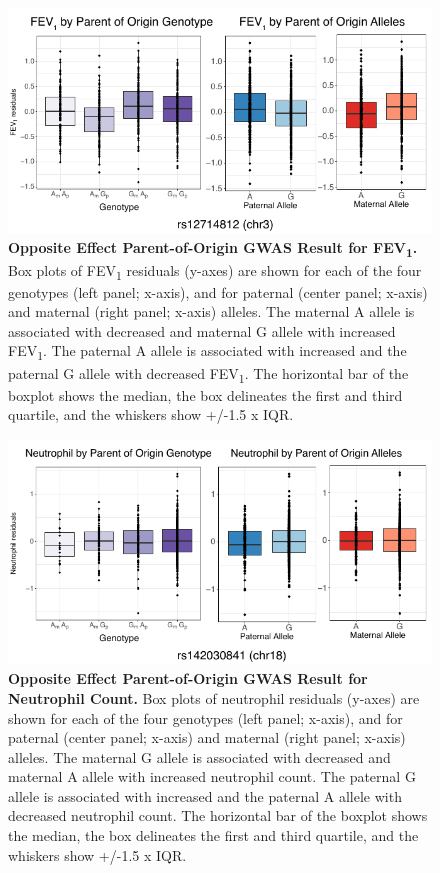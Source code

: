 \begin{figure}[!htb]
\centering
\includegraphics[width=5in]{img/ch02/fig-s13.pdf}
\caption[Opposite Effect Parent-of-Origin GWAS Result for FEV\textsubscript{1}.]{\textbf{Opposite Effect Parent-of-Origin GWAS Result for FEV\textsubscript{1}.} Box plots of FEV\textsubscript{1} residuals (y-axes) are shown for each of the four genotypes (left panel; x-axis), and for paternal (center panel; x-axis) and maternal (right panel; x-axis) alleles. The maternal A allele is associated with decreased and maternal G allele with increased FEV\textsubscript{1}. The paternal A allele is associated with increased and the paternal G allele with decreased FEV\textsubscript{1}. The horizontal bar of the boxplot shows the median, the box delineates the first and third quartile, and the whiskers show +/-1.5 x IQR.}
\label{fig:fig-s13}
\end{figure}

\begin{figure}[!htb]
\centering
\includegraphics[width=5in]{img/ch02/fig-s14.pdf}
\caption[Opposite Effect Parent-of-Origin GWAS Result for Neutrophil Count.]{\textbf{Opposite Effect Parent-of-Origin GWAS Result for Neutrophil Count.}  Box plots of neutrophil residuals (y-axes) are shown for each of the four genotypes (left panel; x-axis), and for paternal (center panel; x-axis) and maternal (right panel; x-axis) alleles. The maternal G allele is associated with decreased and maternal A allele with increased neutrophil count. The paternal G allele is associated with increased and the paternal A allele with decreased neutrophil count. The horizontal bar of the boxplot shows the median, the box delineates the first and third quartile, and the whiskers show +/-1.5 x IQR.}
\label{fig:fig-s14}
\end{figure}







